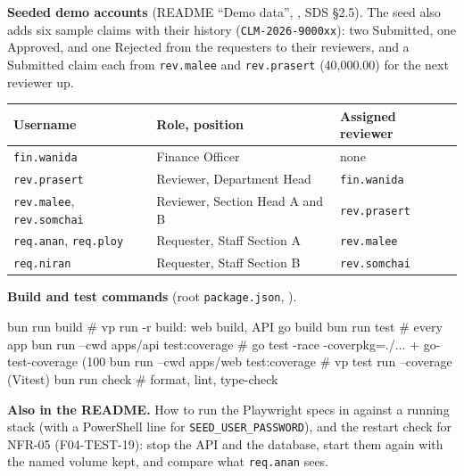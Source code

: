 \textbf{Seeded demo accounts} (README ``Demo data'', , SDS \S2.5). The seed also adds six sample claims with their history (\texttt{CLM-2026-9000xx}): two Submitted, one Approved, and one Rejected from the requesters to their reviewers, and a Submitted claim each from \texttt{rev.malee} and \texttt{rev.prasert} (40,000.00) for the next reviewer up.

\begin{center}\small
\begin{tabular}{@{}lll@{}}
\toprule \textbf{Username} & \textbf{Role, position} & \textbf{Assigned reviewer} \\ \midrule
\texttt{fin.wanida} & Finance Officer & none \\
\texttt{rev.prasert} & Reviewer, Department Head & \texttt{fin.wanida} \\
\texttt{rev.malee}, \texttt{rev.somchai} & Reviewer, Section Head A and B & \texttt{rev.prasert} \\
\texttt{req.anan}, \texttt{req.ploy} & Requester, Staff Section A & \texttt{rev.malee} \\
\texttt{req.niran} & Requester, Staff Section B & \texttt{rev.somchai} \\
\bottomrule
\end{tabular}
\end{center}

\textbf{Build and test commands} (root \texttt{package.json}, ).

\begin{shell}
bun run build                               # vp run -r build: web build, API go build
bun run test                                # every app
bun run --cwd apps/api test:coverage        # go test -race -coverpkg=./... + go-test-coverage (100%
bun run --cwd apps/web test:coverage        # vp test run --coverage (Vitest)
bun run check                               # format, lint, type-check
\end{shell}

\textbf{Also in the README.} How to run the Playwright specs in  against a running stack (with a PowerShell line for \texttt{SEED\_USER\_PASSWORD}), and the restart check for NFR-05 (F04-TEST-19): stop the API and the database, start them again with the named volume kept, and compare what \texttt{req.anan} sees.
